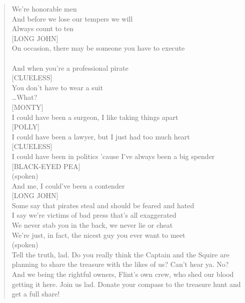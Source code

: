 \documentclass[11pt]{article}
\begin{document}
\begin{verse}
We're honorable men\\
And before we lose our tempers we will\\
Always count to ten\\
\vspace*{1em}
[LONG JOHN]\\
On occasion, there may be someone you have to execute\\
[PIRATES]\\
And when you're a professional pirate\\
\vspace*{1em}
[CLUELESS]\\
You don't have to wear a suit\\
\vspace*{1em}
\ldots{}What?\\
\vspace*{1em}
[MONTY]\\
I could have been a surgeon, I like taking things apart\\
\vspace*{1em}
[POLLY]\\
I could have been a lawyer, but I just had too much heart\\
\vspace*{1em}
[CLUELESS]\\
I could have been in politics 'cause I've always been a big spender\\
\vspace*{1em}
[BLACK-EYED PEA]\\
(spoken)\\
And me, I could've been a contender\\
\vspace*{1em}
[LONG JOHN]\\
Some say that pirates steal and should be feared and hated\\
I say we're victims of bad press that's all exaggerated\\
We never stab you in the back, we never lie or cheat\\
We're just, in fact, the nicest guy you ever want to meet\\
(spoken)\\
Tell the truth, lad. Do you really think the Captain and the Squire are planning to share the treasure with the likes of us? Can't hear ya. No? And we being the rightful owners, Flint's own crew, who shed our blood getting it here. Join us lad. Donate your compass to the treasure hunt and get a full share!\\
\vspace*{1em}

\end{verse}
\end{document}
